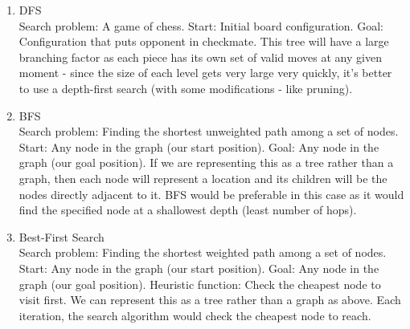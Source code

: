 \documentclass[11pt]{article}
\begin{document}
\begin{enumerate}
	\item DFS
	\\Search problem: A game of chess. Start: Initial board configuration. Goal: Configuration that puts opponent in checkmate. This tree will have a large branching factor as each piece has its own set of valid moves at any given moment - since the size of each level gets very large very quickly, it's better to use a depth-first search (with some modifications - like pruning). 
	\item BFS 
	\\ Search problem: Finding the shortest unweighted path among a set of nodes. Start: Any node in the graph (our start position). Goal: Any node in the graph (our goal position). If we are representing this as a tree rather than a graph, then each node will represent a location and its children will be the nodes directly adjacent to it. BFS would be preferable in this case as it would find the specified node at a shallowest depth (least number of hops).
	\item Best-First Search
	\\Search problem: Finding the shortest weighted path among a set of nodes. Start: Any node in the graph (our start position). Goal: Any node in the graph (our goal position). Heuristic function: Check the cheapest node to visit first. We can represent this as a tree rather than a graph as above. Each iteration, the search algorithm would check the cheapest node to reach.
\end{enumerate}
 
\end{document}
